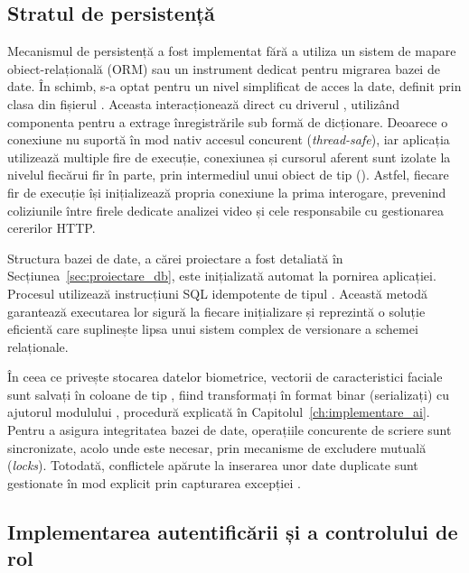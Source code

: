 \documentclass[../../main.tex]{subfiles}
\begin{document}
\subsection{Stratul de persistență}
\label{subsec:persistenta}

Mecanismul de persistență a fost implementat fără a utiliza un sistem de mapare obiect-relațională (ORM) sau un instrument dedicat pentru migrarea bazei de date. În schimb, s-a optat pentru un nivel simplificat de acces la date, definit prin clasa  din fișierul . Aceasta interacționează direct cu driverul , utilizând componenta   pentru a extrage înregistrările sub formă de dicționare. Deoarece o conexiune  nu suportă în mod nativ accesul concurent (\emph{thread-safe}), iar aplicația utilizează multiple fire de execuție, conexiunea și cursorul aferent sunt izolate la nivelul fiecărui fir în parte, prin intermediul unui obiect de tip  (). Astfel, fiecare fir de execuție își inițializează propria conexiune la prima interogare, prevenind coliziunile între firele dedicate analizei video și cele responsabile cu gestionarea cererilor HTTP.

Structura bazei de date, a cărei proiectare a fost detaliată în Secțiunea~\ref{sec:proiectare_db}, este inițializată automat la pornirea aplicației. Procesul utilizează instrucțiuni SQL idempotente de tipul . Această metodă garantează executarea lor sigură la fiecare inițializare și reprezintă o soluție eficientă care suplinește lipsa unui sistem complex de versionare a schemei relaționale.

În ceea ce privește stocarea datelor biometrice, vectorii de caracteristici faciale sunt salvați în coloane de tip , fiind transformați în format binar (serializați) cu ajutorul modulului , procedură explicată în Capitolul~\ref{ch:implementare_ai}. Pentru a asigura integritatea bazei de date, operațiile concurente de scriere sunt sincronizate, acolo unde este necesar, prin mecanisme de excludere mutuală (\emph{locks}). Totodată, conflictele apărute la inserarea unor date duplicate sunt gestionate în mod explicit prin capturarea excepției .

\subsection{Implementarea autentificării și a controlului de rol}
\end{document}
